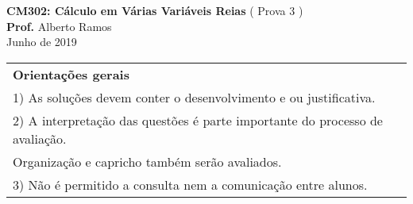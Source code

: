 \documentclass[11pt]{exam}
\begin{document}
\ifdefined\answers
\printanswers
\fi

\addpoints

\begin{center}
  {\bf \large CM302:  Cálculo em Várias Variáveis Reias} ( Prova 3 ) \\
  {\bf Prof.} Alberto Ramos \\
 Junho de 2019
\end{center}

\ifx\undefined\answers
{} %
\cellwidth{0pt}

\fi

\begin{center}
  \begin{tabular}{|l|}
    \hline
    {\bf Orientações gerais}\\
    1) As soluções devem conter o desenvolvimento e ou justificativa. 
    \hspace{2.5mm} \\
    2) A interpretação das questões é parte importante do processo de avaliação.\\
    \hspace{2.5mm} Organização e capricho também serão avaliados. \\
    3) Não é permitido a consulta nem a comunicação entre alunos.\\
   \hline 
  \end{tabular} 
\end{center}
  
  
\end{document}
